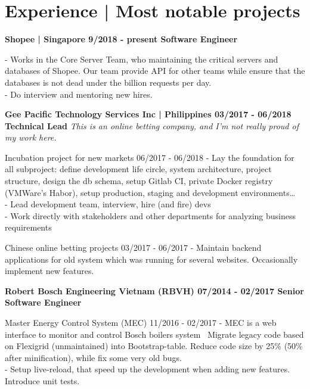 \section*{Experience | \small{Most notable projects}}
{%
    \textbf{\event
      {Shopee | Singapore}
      {9/2018 - present}
      {Software Engineer}
    }

  {
    - Works in the Core Server Team, who maintaining the critical servers and
      databases of Shopee. Our team provide API for other teams while ensure
      that the databases is not dead under the billion requests per day.
      \\
    - Do interview and mentoring new hires.
  }
  \break

  \textbf{\event
    {Gee Pacific Technology Services Inc | Philippines}
    {03/2017 - 06/2018}
    {Technical Lead}
  }
  \textit{This is an online betting company, and I'm not really proud of my work
    here.}

  \event
  {Incubation project for new markets}
  {06/2017 - 06/2018}
  {
    - Lay the foundation for all subproject: define development life circle,
      system architecture, project structure, design the db schema, setup Gitlab
      CI, private Docker registry (VMWare's Habor), setup production, staging and
      development environments\dots
      \\
    - Lead development team, interview, hire (and fire) devs
      \\
    - Work directly with stakeholders and other departments for analyzing
      business requirements
  }

  \event
  {Chinese online betting projects}
  {03/2017 - 06/2017}
  {
    - Maintain backend applications for old system which was running for several
      websites. Occasionally implement new features.
  }

  \textbf{\event
    {Robert Bosch Engineering Vietnam (RBVH)}
    {07/2014 - 02/2017}
    {Senior Software Engineer}
  }

  \event
  {Master Energy Control System (MEC)}
  {11/2016 - 02/2017}
  {
    - MEC is a web interface to monitor and control Bosch boilers system
      \
       Migrate legacy code based on Flexigrid (unmaintained) into Bootstrap-table.
      Reduce code size by 25\% (50\% after minification), while fix some very old
      bugs.\\
      - Setup live-reload, that speed up the development when adding new
      features. Introduce unit tests.
  }

}
